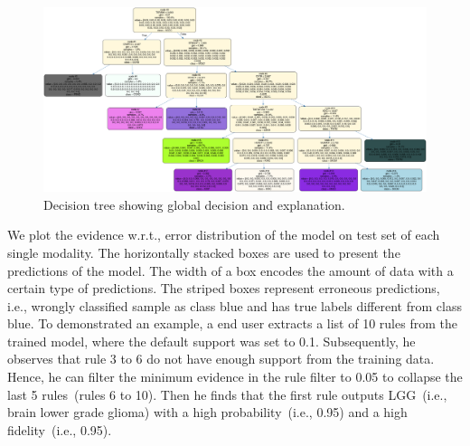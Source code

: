 \begin{figure}
	\centering
		\includegraphics[scale=0.25]{images/simple_tree_pre.png}
	    \caption{Decision tree showing global decision and explanation.}
	    \label{fig:skater_global}
\end{figure}

\hspace*{3.5mm} We plot the evidence w.r.t., error distribution of the model on  test set of each single modality. The horizontally stacked boxes are used to present the predictions of the model. The width of a box encodes the amount of data with a certain type of predictions. The striped boxes represent erroneous predictions, i.e., wrongly classified  sample as class blue and has true labels different from class blue. To demonstrated an example, a end user extracts a list of 10 rules from the trained model, where the default support was set to 0.1. Subsequently, he observes that rule 3 to 6 do not have enough support from the training data. Hence, he can filter the minimum evidence in the rule filter to 0.05 to collapse the last 5 rules~(rules 6 to 10). Then he finds that the first rule outputs LGG~(i.e., brain lower grade glioma) with a high probability~(i.e., 0.95) and a high fidelity~(i.e., 0.95). 

